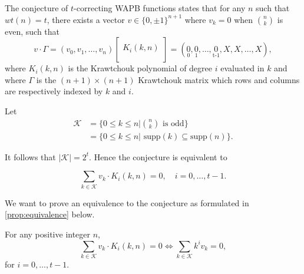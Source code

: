 The conjecture of $t$-correcting WAPB functions states that for any $n$ such that $wt(n) = t$, there exists a vector $v \in \{0, \pm 1\}^{n+1}$ where $v_k = 0$ when $\binom{n}{k}$ is even, such that
$$
v \cdot \Gamma = (v_0, v_1, \ldots, v_n)
\begin{bmatrix}
    \\
    K_i(k, n) \\
    \\
\end{bmatrix} = (\underset{\operatorname{0}}{0}, \underset{\operatorname{1}}{0}, \ldots, \underset{\operatorname{t - 1}}{0}, X, X, \ldots, X),
$$
where $K_i(k,n)$ is the Krawtchouk polynomial of degree $i$ evaluated in $k$ and where $\Gamma$ is the $(n+1) \times (n + 1)$ Krawtchouk matrix which rows and columns are respectively indexed by $k$ and $i$.

Let
\begin{equation*}
\begin{split}
    \mathcal{K} &= \{0 \leq k \leq n | \binom{n}{k} \text{ is odd}\}\\
    &=\{0 \leq k \leq n | \text{ supp}(k) \subseteq \text{supp}(n)\}.
\end{split}
\end{equation*}

It follows that $|\mathcal{K}| = 2^t$. Hence the conjecture is equivalent to

\begin{equation}\label{eq:statement}
    \sum_{k \in \mathcal{K}} v_k \cdot K_i(k, n) = 0, \quad i = 0, \ldots, t-1.
\end{equation}

We want to prove an equivalence to the conjecture as formulated in \cref{prop:equivalence} below.
\begin{proposition}\label{prop:equivalence}
For any positive integer $n$,
$$\sum_{k \in \mathcal{K}} v_k \cdot K_i(k, n) = 0 \Longleftrightarrow \sum_{k \in \mathcal{K}} k^iv_k= 0,$$
for $i = 0, \ldots, t-1$.
\end{proposition}

